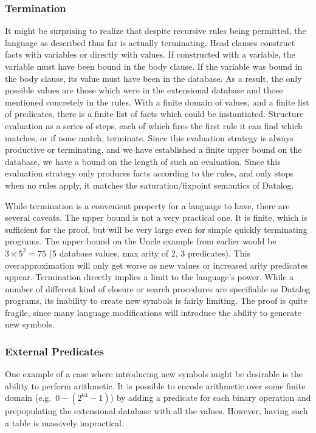 \subsubsection{Termination}
It might be surprising to realize that despite recursive rules being permitted, the language as described thus far is actually terminating.
Head clauses construct facts with variables or directly with values.
If constructed with a variable, the variable must have been bound in the body clause.
If the variable was bound in the body clause, its value must have been in the database.
As a result, the only possible values are those which were in the extensional database and those mentioned concretely in the rules.
With a finite domain of values, and a finite list of predicates, there is a finite list of facts which could be instantiated.
Structure evaluation as a series of steps, each of which fires the first rule it can find which matches, or if none match, terminate.
Since this evaluation strategy is always productive or terminating, and we have established a finite upper bound on the database, we have a bound on the length of such an evaluation.
Since this evaluation strategy only produces facts according to the rules, and only stops when no rules apply, it matches the saturation/fixpoint semantics of Datalog.

While termination is a convenient property for a language to have, there are several caveats.
%
The upper bound is not a very practical one.
It is finite, which is sufficient for the proof, but will be very large even for simple quickly terminating programs.
The upper bound on the Uncle example from earlier would be $3 \times 5^2 = 75$ (5 database values, max arity of 2, 3 predicates).
This overapproximation will only get worse as new values or increased arity predicates appear.
%
Termination directly implies a limit to the language's power.
While a number of different kind of closure or search procedures are specifiable as Datalog programs, its inability to create new symbols is fairly limiting.
%
The proof is quite fragile, since many language modifications will introduce the ability to generate new symbols.
\subsubsection{External Predicates}
\label{sec:extpred}
One example of a case where introducing new symbols might be desirable is the ability to perform arithmetic.
It is possible to encode arithmetic over some finite domain (e.g.\ $0-(2^{64} - 1)$) by adding a predicate for each binary operation and prepopulating the extensional database with all the values.
However, having such a table is massively impractical.

